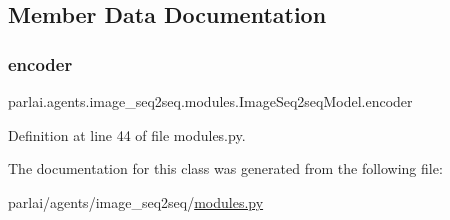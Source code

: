 \subsection{Member Data Documentation}
\mbox{\label{classparlai_1_1agents_1_1image__seq2seq_1_1modules_1_1ImageSeq2seqModel_a1778f43e2d6791c04c2c786e71b1adae}} 
\subsubsection{\texorpdfstring{encoder}{encoder}}
{\footnotesize\ttfamily parlai.\+agents.\+image\+\_\+seq2seq.\+modules.\+Image\+Seq2seq\+Model.\+encoder}



Definition at line 44 of file modules.\+py.



The documentation for this class was generated from the following file\+:\begin{DoxyCompactItemize}
\item 
parlai/agents/image\+\_\+seq2seq/\hyperlink{parlai_2agents_2image__seq2seq_2modules_8py}{modules.\+py}\end{DoxyCompactItemize}
